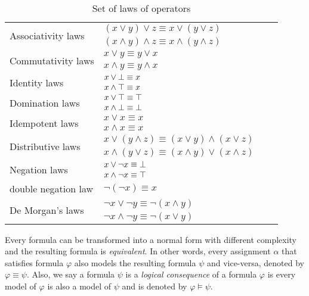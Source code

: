 \begin{table}[!htbp]
 \centering
 \begin{tabular}{lllc}
  \multirow{2}{*}{Associativity laws} & $(x \lor y) \lor z \equiv x \lor (y \lor z)$\\
									 & $(x \land y) \land z \equiv x \land (y \land z)$\\
  \hline 												 
  \multirow{2}{*}{Commutativity laws} & $x \lor y \equiv y \lor x$\\
									 & $x \land y \equiv y \land x$\\
  \hline 					
  \multirow{2}{*}{Identity laws} & $x \lor \bot \equiv x$\\
							    & $x \land \top \equiv x$\\
  \hline				    
  \multirow{2}{*}{Domination laws} & $x \lor \top \equiv \top$\\
 								  &  $x \land \bot \equiv \bot$\\
  \hline				    
  \multirow{2}{*}{Idempotent laws} & $x \lor x \equiv x$\\
  							      & $x \land x \equiv x$\\	    
  \hline				    
  \multirow{2}{*}{Distributive laws} & $x \lor (y \land z) \equiv (x \lor y) \land (x \lor z)$\\
								   & $x \land (y \lor z) \equiv (x \land y) \lor (x \land z)$\\
 \hline				    
 \multirow{2}{*}{Negation laws}  & $x \lor \neg x \equiv \bot$\\
								& $x \land \neg x \equiv \top$\\
  \hline
   double negation law & $\neg (\neg x) \equiv x$ \\
  \hline
  \multirow{2}{*}{De Morgan's laws} & $\neg x \lor \neg y \equiv \neg (x \land y)$\\
								    &  $\neg x \land \neg y \equiv \neg (x \lor y)$\\
 \end{tabular}
 \caption{Set of laws of operators}
 \label{tab:laws}
\end{table}

Every formula can be transformed into a normal form with different complexity and the resulting formula is 
\emph{equivalent}.  
In other words, every assignment $\alpha$ that satisfies formula $\varphi$  also models the resulting formula $\psi$
and vice-versa, denoted by $\varphi \equiv \psi$.
 Also, we say a formula $\psi$ is a \emph{logical consequence} of a formula $\varphi$ is every model of $\varphi$
 is also a model of $\psi$ and is denoted by $\varphi \models \psi$.

